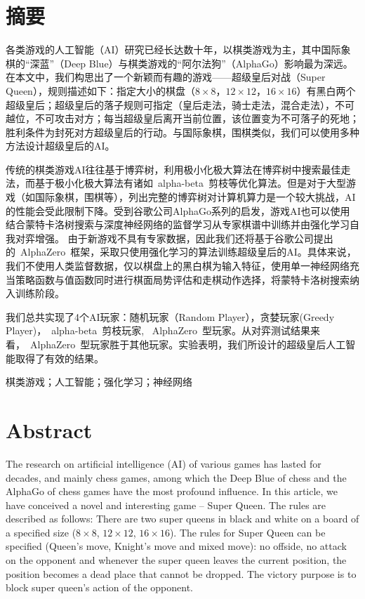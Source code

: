 \chapter*{摘要}

各类游戏的人工智能（AI）研究已经长达数十年，以棋类游戏为主，其中国际象棋的“深蓝”（Deep Blue）与棋类游戏的“阿尔法狗”（AlphaGo）影响最为深远。
在本文中，我们构思出了一个新颖而有趣的游戏——超级皇后对战（Super Queen），规则描述如下：指定大小的棋盘（$8\times8$，$12\times12$，$16\times16$）有黑白两个超级皇后；超级皇后的落子规则可指定（皇后走法，骑士走法，混合走法），不可越位，不可攻击对方；每当超级皇后离开当前位置，该位置变为不可落子的死地；
胜利条件为封死对方超级皇后的行动。与国际象棋，围棋类似，我们可以使用多种方法设计超级皇后的AI。


传统的棋类游戏AI往往基于博弈树，利用极小化极大算法在博弈树中搜索最佳走法，而基于极小化极大算法有诸如~alpha-beta~剪枝等优化算法。但是对于大型游戏（如国际象棋，围棋等），列出完整的博弈树对计算机算力是一个较大挑战，AI的性能会受此限制下降。受到谷歌公司AlphaGo系列的启发，游戏AI也可以使用结合蒙特卡洛树搜索与深度神经网络的监督学习从专家棋谱中训练并由强化学习自我对弈增强。
由于新游戏不具有专家数据，因此我们还将基于谷歌公司提出的~AlphaZero~框架，采取只使用强化学习的算法训练超级皇后的AI。具体来说，我们不使用人类监督数据，仅以棋盘上的黑白棋为输入特征，使用单一神经网络充当策略函数与值函数同时进行棋面局势评估和走棋动作选择，将蒙特卡洛树搜索纳入训练阶段。


我们总共实现了4个AI玩家：随机玩家（Random Player），贪婪玩家(Greedy Player)，~alpha-beta~剪枝玩家, ~AlphaZero~型玩家。从对弈测试结果来看，~AlphaZero~型玩家胜于其他玩家。实验表明，我们所设计的超级皇后人工智能取得了有效的结果。

\medskip
{} 棋类游戏；人工智能；强化学习；神经网络

\chapter*{Abstract}

The research on artificial intelligence (AI) of various games has lasted for decades, and mainly chess games, among which the Deep Blue of chess and the AlphaGo of chess games have the most profound influence.
In this article, we have conceived a novel and interesting game -- Super Queen. The rules are described as follows: There are two super queens in black and white on a board of a specified size ($8\times8$, $12\times12$, $16\times16$). The rules for Super Queen can be specified (Queen's move, Knight's move and mixed move): no offside, no attack on the opponent and whenever the super queen leaves the current position, the position becomes a dead place that cannot be dropped. The victory purpose is to block super queen's action of the opponent.


